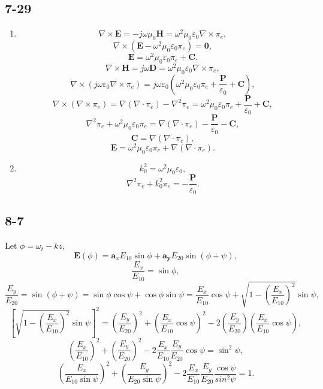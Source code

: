 \documentclass[11pt,a4paper]{article}
\begin{document}
\subsection{7-29}

\begin{enumerate}[label=\alph*)]
\item
$$\nabla\times\mathbf{E}=-j\omega\mu_0\mathbf{H}=\omega^2\mu_0\varepsilon_0\nabla\times \pi_e,$$
$$\nabla\times(\mathbf{E}-\omega^2\mu_0\varepsilon_0\pi_e)=\mathbf{0},$$
$$\mathbf{E}=\omega^2\mu_0\varepsilon_0\pi_e+\mathbf{C}.$$
$$\nabla\times\mathbf{H}=j\omega\mathbf{D}=\omega^2\mu_0\varepsilon_0\nabla\times \pi_e,$$
$$\nabla\times(j\omega\varepsilon_0\nabla\times\pi_e)=j\omega\varepsilon_0(\omega^2\mu_0\varepsilon_0\pi_e+\frac{\mathbf{P}}{\varepsilon_0}+\mathbf{C}),$$
$$\nabla\times(\nabla\times\pi_e)=\nabla(\nabla\cdot\pi_e)-\nabla^2\pi_e=\omega^2\mu_0\varepsilon_0\pi_e+\frac{\mathbf{P}}{\varepsilon_0}+\mathbf{C},$$
$$\nabla^2\pi_e+\omega^2\mu_0\varepsilon_0\pi_e=\nabla(\nabla\cdot\pi_e)-\frac{\mathbf{P}}{\varepsilon_0}-\mathbf{C},$$
$$\mathbf{C}=\nabla(\nabla\cdot\pi_e),$$
$$\mathbf{E}=\omega^2\mu_0\varepsilon_0\pi_e+\nabla(\nabla\cdot\pi_e).$$
\item
$$k_0^2=\omega^2\mu_0\varepsilon_0,$$
$$\nabla^2\pi_e+k_0^2\pi_e=-\frac{\mathbf{P}}{\varepsilon_0}.$$
\end{enumerate}

\subsection{8-7}
Let $\phi=\omega_t-kz$,
$$\mathbf{E}(\phi)=\mathbf{a}_xE_{10}\sin\phi+\mathbf{a_y}E_{20}\sin(\phi+\psi),$$
$$\frac{E_x}{E_{10}}=\sin\phi,$$
$$\frac{E_y}{E_{20}}=\sin(\phi+\psi)=\sin\phi\cos\psi+\cos\phi\sin\psi=\frac{E_x}{E_{10}}\cos\psi+\sqrt{1-\left(\frac{E_x}{E_{10}}\right)^2}\sin\psi,$$
$$\left[\sqrt{1-\left(\frac{E_x}{E_{10}}\right)^2}\sin\psi\right]^2=\left(\frac{E_y}{E_{20}}\right)^2+\left(\frac{E_x}{E_{10}}\cos\psi\right)^2-2\left(\frac{E_y}{E_{20}}\right)\left(\frac{E_x}{E_{10}}\cos\psi\right),$$
$$\left(\frac{E_x}{E_{10}}\right)^2+\left(\frac{E_y}{E_{20}}\right)^2-2\frac{E_x}{E_{10}}\frac{E_y}{E_{20}}\cos\psi=\sin^2\psi,$$
$$\left(\frac{E_x}{E_{10}\sin\psi}\right)^2+\left(\frac{E_y}{E_{20}\sin\psi}\right)^2-2\frac{E_x}{E_{10}}\frac{E_y}{E_{20}}\frac{\cos\psi}{sin^2\psi}=1.$$
\end{document}
